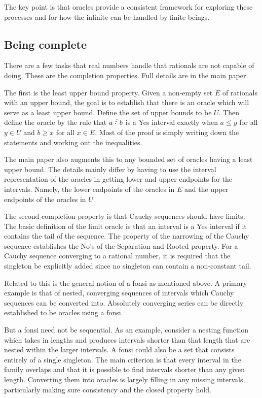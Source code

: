 \documentclass[12pt]{article}
\begin{document}
The key point is that oracles provide a consistent framework for exploring these processes and for  how the infinite can be handled by finite beings.

\subsection{Being complete}

There are a few tasks that real numbers handle that rationals are not capable of doing. These are the completion properties. Full details are in the main paper.

The first is the least upper bound property. Given a non-empty set $E$ of rationals with an upper bound, the goal is  to establish that there is an oracle which will serve as a least upper bound. Define the set of upper bounds to be $U$. Then define the oracle by the rule that $a\lte b$ is a Yes interval exactly when $a\leq y$ for all $y \in U$ and $b\geq x$ for all $x\in E$. Most of the proof is simply writing down the statements and working out the inequalities. 

The main paper also augments this to any bounded set of oracles having a least upper bound. The details mainly differ by having to use the interval representation of the oracles in getting lower and upper endpoints for the intervals. Namely, the lower endpoints of the oracles in $E$ and the upper endpoints of the oracles in $U$. 

The second completion property is that Cauchy sequences should have limits. The basic definition of the limit oracle is that an interval is a Yes interval if it contains the tail of the sequence. The property of the narrowing of the Cauchy sequence establishes the No's of the Separation and Rooted property. For a Cauchy sequence converging to a rational number, it is required that the singleton be explicitly added since no singleton can contain a non-constant tail.

Related to this is the general notion of a fonsi as mentioned above. A primary example is that of nested, converging sequences of intervals which Cauchy sequences can be converted into. Absolutely converging series can be directly established to be oracles using a fonsi. 

But a fonsi need not be sequential. As an example, consider a nesting function which takes in lengths and produces intervals shorter than that length that are nested within the larger intervals. A fonsi could also be a set that consists entirely of a single singleton. The main criterion is that every interval in the family overlaps and that it is possible to find intervals shorter than any given length. Converting them into oracles is largely filling in any missing intervals, particularly making sure consistency and the closed property hold.  
\end{document}
